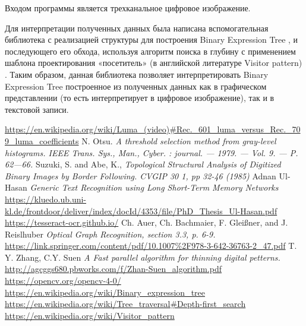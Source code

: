 \documentclass[makeidx, a4paper, 14pt]{extarticle}
\begin{document}
Входом программы является трехканальное цифровое изображение.

Для интерпретации полученных данных была написана вспомогательная библиотека с реализацией структуры для построения Binary Expression Tree \cite{binary_tree},
и последующего его обхода, используя алгоритм поиска в глубину \cite{dfs} с применением шаблона проектирования «посетитель» (в английской литературе Visitor pattern) \cite{visitor}.
Таким образом, данная библиотека позволяет интерпретировать Binary Expression Tree построенное из полученных данных как в графическом представлении (то есть интерпретирует в цифровое изображение),
так и в текстовой записи.

\begin{thebibliography}{}
     \url{https://en.wikipedia.org/wiki/Luma_(video)#Rec._601_luma_versus_Rec._709_luma_coefficients}
     N. Otsu.
        \textit{A threshold selection method from gray-level histograms. IEEE Trans. Sys., Man., Cyber. : journal. — 1979. — Vol. 9. — P. 62—66.}
     Suzuki, S. and Abe, K.,
        \textit{Topological Structural Analysis of Digitized Binary Images by Border Following. CVGIP 30 1, pp 32-46 (1985)}
     Adnan Ul-Hasan
        \textit{Generic Text Recognition using Long Short-Term Memory Networks}
        \url{https://kluedo.ub.uni-kl.de/frontdoor/deliver/index/docId/4353/file/PhD_Thesis_Ul-Hasan.pdf}    
        \url{https://tesseract-ocr.github.io/}
     Ch. Auer, Ch. Bachmaier, F. Gleißner, and J. Reislhuber
        \textit{Optical Graph Recognition, section 3.3, p. 6-9.}
        \url{https://link.springer.com/content/pdf/10.1007%2F978-3-642-36763-2_47.pdf}
      T. Y. Zhang, C.Y. Suen
        \textit{A Fast parallel algorithm for thinning digital petterns.}
        \url{http://agcggs680.pbworks.com/f/Zhan-Suen_algorithm.pdf}
        \url{https://opencv.org/opencv-4-0/}
        \url{https://en.wikipedia.org/wiki/Binary_expression_tree}
        \url{https://en.wikipedia.org/wiki/Tree_traversal#Depth-first_search}
        \url{https://en.wikipedia.org/wiki/Visitor_pattern}
    \end{thebibliography}
\end{document}
